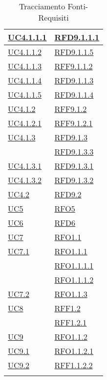 \begin{longtable}{|>{\centering}m{5cm}|m{5cm}<{\centering}|}
\hyperref[UC4.1.1.1]{UC4.1.1.1} & \hyperlink{RFD9.1.1.1}{RFD9.1.1.1}\\ \hline
\hyperref[UC4.1.1.2]{UC4.1.1.2} & \hyperlink{RFD9.1.1.5}{RFD9.1.1.5}\\ \hline
\hyperref[UC4.1.1.3]{UC4.1.1.3} & \hyperlink{RFF9.1.1.2}{RFF9.1.1.2}\\ \hline
\hyperref[UC4.1.1.4]{UC4.1.1.4} & \hyperlink{RFD9.1.1.3}{RFD9.1.1.3}\\ \hline
\hyperref[UC4.1.1.5]{UC4.1.1.5} & \hyperlink{RFD9.1.1.4}{RFD9.1.1.4}\\ \hline
\hyperref[UC4.1.2]{UC4.1.2} & \hyperlink{RFF9.1.2}{RFF9.1.2}\\ \hline
\hyperref[UC4.1.2.1]{UC4.1.2.1} & \hyperlink{RFF9.1.2.1}{RFF9.1.2.1}\\ \hline
\hyperref[UC4.1.3]{UC4.1.3} & \hyperlink{RFD9.1.3}{RFD9.1.3}\\
& \hyperlink{RFD9.1.3.3}{RFD9.1.3.3}\\ \hline
\hyperref[UC4.1.3.1]{UC4.1.3.1} & \hyperlink{RFD9.1.3.1}{RFD9.1.3.1}\\ \hline
\hyperref[UC4.1.3.2]{UC4.1.3.2} & \hyperlink{RFD9.1.3.2}{RFD9.1.3.2}\\ \hline
\hyperref[UC4.2]{UC4.2} & \hyperlink{RFD9.2}{RFD9.2}\\ \hline
\hyperref[UC5]{UC5} & \hyperlink{RFO5}{RFO5}\\ \hline
\hyperref[UC6]{UC6} & \hyperlink{RFD6}{RFD6}\\ \hline
\hyperref[UC7]{UC7} & \hyperlink{RFO1.1}{RFO1.1}\\ \hline
\hyperref[UC7.1]{UC7.1} & \hyperlink{RFO1.1.1}{RFO1.1.1}\\
& \hyperlink{RFO1.1.1.1}{RFO1.1.1.1}\\
& \hyperlink{RFO1.1.1.2}{RFO1.1.1.2}\\ \hline
\hyperref[UC7.2]{UC7.2} & \hyperlink{RFO1.1.3}{RFO1.1.3}\\ \hline
\hyperref[UC8]{UC8} & \hyperlink{RFF1.2}{RFF1.2}\\
& \hyperlink{RFF1.2.1}{RFF1.2.1}\\ \hline
\hyperref[UC9]{UC9} & \hyperlink{RFO1.1.2}{RFO1.1.2}\\ \hline
\hyperref[UC9.1]{UC9.1} & \hyperlink{RFO1.1.2.1}{RFO1.1.2.1}\\ \hline
\hyperref[UC9.2]{UC9.2} & \hyperlink{RFF1.1.2.2}{RFF1.1.2.2}\\ \hline
\caption[Tracciamento Fonti-Requisiti]{Tracciamento Fonti-Requisiti}
\label{tabella:fonti-requi}
\end{longtable}
\clearpage
